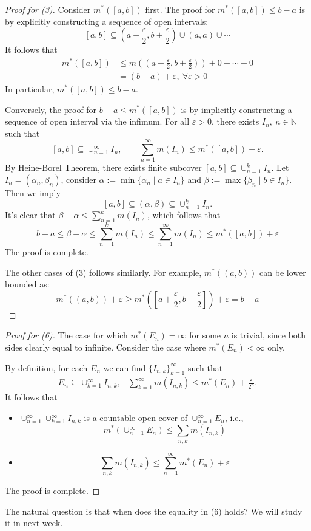 \begin{proof}[Proof for (3)]
Consider $m^*([a,b])$ first. The proof for $m^*([a,b])\le b-a$ is by explicitly constructing a sequence of open intervals:
\[
[a,b]\subseteq(a-\frac{\varepsilon}{2},b+\frac{\varepsilon}{2})\cup(a,a)\cup\cdots
\]
It follows that 
\begin{align*}
m^*([a,b])&\le m((a-\frac{\varepsilon}{2},b+\frac{\varepsilon}{2}))+0+\cdots+0\\&=(b-a)+\varepsilon,\ \forall\varepsilon>0
\end{align*}
In particular, $m^*([a,b])\le b-a$.

Conversely, the proof for $b-a\le m^*([a,b])$ is by implicitly constructing a sequence of open interval via the infimum. For all $\varepsilon>0$, there exists $I_n, \ n\in\mathbb{N}$ such that
\[
[a,b]\subseteq \cup_{n=1}^\infty I_n,\qquad
\sum_{n=1}^\infty m(I_n)\le m^*([a,b])+\varepsilon.
\]
By Heine-Borel Theorem, there exists finite subcover 
$[a,b]\subseteq \cup_{n=1}^k I_n$.
Let $I_n = (\alpha_n,\beta_n)$, consider $\alpha:=\min\{\alpha_n\mid a\in I_n\}$ and $\beta:=\max\{\beta_n\mid b\in I_n\}$.
Then we imply 
\[
[a,b]\subseteq(\alpha,\beta)\subseteq \cup_{n=1}^kI_n.
\]
It's clear that $\beta - \alpha\le \sum_{n=1}^km(I_n)$, which follows that
\[
b-a\le \beta-\alpha\le \sum_{n=1}^km(I_n)\le\sum_{n=1}^\infty m(I_n)\le m^*([a,b])+\varepsilon
\]
The proof is complete.

The other cases of (3) follows similarly. For example, $m^*((a,b))$ can be lower bounded as: 
\[
m^*((a,b))+\varepsilon\ge m^*([a+\frac{\varepsilon}{2},b-\frac{\varepsilon}{2}])+\varepsilon=b-a
\]
\end{proof}
\begin{proof}[Proof for (6)]
The case for which $m^*(E_n)=\infty$ for some $n$ is trivial, since both sides clearly equal to infinite.
Consider the case where $m^*(E_n)<\infty$ only.

By definition, for each $E_n$ we can find $\{I_{n,k}\}_{k=1}^\infty$ such that 
\[
\begin{array}{ll}
E_n\subseteq\cup_{k=1}^\infty I_{n,k},
&
\sum_{k=1}^\infty m(I_{n,k})\le m^*(E_n) + \frac{\varepsilon}{2^n}.
\end{array}
\]
It follows that
\begin{itemize}
\item
$\cup_{n=1}^\infty\cup_{k=1}^\infty I_{n,k}$ is a countable open cover of $\cup_{n=1}^\infty E_n$, i.e.,
\[
m^*(\cup_{n=1}^\infty E_n)\le \sum_{n,k}m(I_{n,k})
\]
\item
\[
\sum_{n,k}m(I_{n,k})\le \sum_{n=1}^\infty m^*(E_n)+\varepsilon
\]
\end{itemize}
The proof is complete.
\end{proof}
The natural question is that when does the equality in (6) holds? 
We will study it in next week. 

